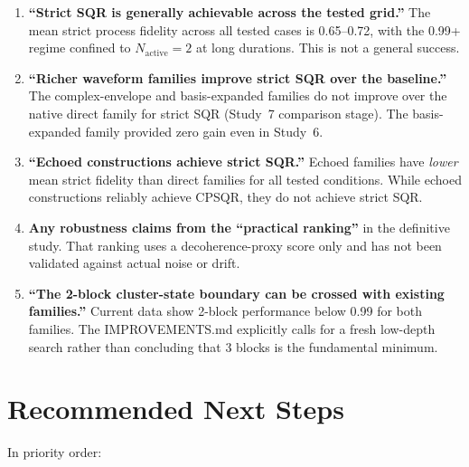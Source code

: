 \documentclass[11pt,letterpaper]{article}
\newcommand{\nact}{N_{\text{active}}}
\begin{document}
\begin{enumerate}
\item \textbf{``Strict SQR is generally achievable across the tested grid.''}
  The mean strict process fidelity across all tested cases is 0.65--0.72,
  with the 0.99+ regime confined to $\nact = 2$ at long durations.
  This is not a general success.

\item \textbf{``Richer waveform families improve strict SQR over the baseline.''}
  The complex-envelope and basis-expanded families do not improve over the
  native direct family for strict SQR (Study~7 comparison stage).
  The basis-expanded family provided zero gain even in Study~6.

\item \textbf{``Echoed constructions achieve strict SQR.''}
  Echoed families have \emph{lower} mean strict fidelity than direct families
  for all tested conditions.  While echoed constructions reliably achieve CPSQR,
  they do not achieve strict SQR.

\item \textbf{Any robustness claims from the ``practical ranking''} in the definitive study.
  That ranking uses a decoherence-proxy score only and has not been validated
  against actual noise or drift.

\item \textbf{``The 2-block cluster-state boundary can be crossed with existing families.''}
  Current data show 2-block performance below 0.99 for both families.
  The IMPROVEMENTS.md explicitly calls for a fresh low-depth search rather than
  concluding that 3 blocks is the fundamental minimum.
\end{enumerate}

\section{Recommended Next Steps}

In priority order:
\end{document}
